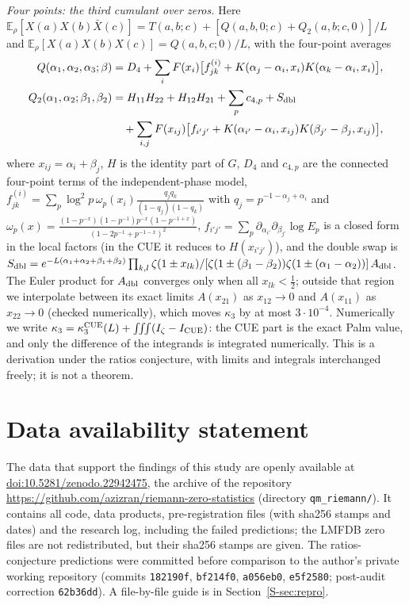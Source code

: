 \documentclass[12pt]{amsart}
\theoremstyle{remark}
\newcommand{\E}{\mathbb{E}}
\newcommand{\1}{\mathbf{1}}
\begin{document}
\emph{Four points: the third cumulant over zeros.} Here
$\E_\rho[X(a)X(b)\bar X(c)]=T(a,b;c)+[Q(a,b,0;c)+Q_2(a,b;c,0)]/L$ and
$\E_\rho[X(a)X(b)X(c)]=Q(a,b,c;0)/L$, with the four-point averages
\begin{align*}
Q(\alpha_1,\alpha_2,\alpha_3;\beta)&=D_4+\sum_iF(x_i)\bigl[f^{(i)}_{jk}
+K(\alpha_j-\alpha_i,x_i)K(\alpha_k-\alpha_i,x_i)\bigr],\\
Q_2(\alpha_1,\alpha_2;\beta_1,\beta_2)&=H_{11}H_{22}+H_{12}H_{21}+\sum_pc_{4,p}+S_{\rm dbl}\\
&\quad+\sum_{i,j}F(x_{ij})\bigl[f_{i'j'}+K(\alpha_{i'}-\alpha_i,x_{ij})K(\beta_{j'}-\beta_j,x_{ij})\bigr],
\end{align*}
where $x_{ij}=\alpha_i+\beta_j$, $H$ is the identity part of $G$, $D_4$ and
$c_{4,p}$ are the connected four-point terms of the independent-phase model,
$f^{(i)}_{jk}=\sum_p\log^2p\,\omega_p(x_i)\frac{q_jq_k}{(1-q_j)(1-q_k)}$ with
$q_j=p^{-1-\alpha_j+\alpha_i}$ and
$\omega_p(x)=\frac{(1-p^{-x})(1-p^{-1})p^{-x}(1-p^{-1+x})}{(1-2p^{-1}+p^{-1-x})^2}$,
$f_{i'j'}=\sum_p\partial_{\alpha_{i'}}\partial_{\beta_{j'}}\log E_p$ is a
closed form in the local factors (in the CUE it reduces to $H(x_{i'j'})$), and
the double swap is
$S_{\rm dbl}=e^{-L(\alpha_1+\alpha_2+\beta_1+\beta_2)}\prod_{k,l}\zeta(1\pm x_{lk})
/[\zeta(1\pm(\beta_1-\beta_2))\zeta(1\pm(\alpha_1-\alpha_2))]\,A_{\rm dbl}$.
The Euler product for $A_{\rm dbl}$ converges only when all $x_{lk}<\frac12$;
outside that region we interpolate between its exact limits
$A(x_{21})$ as $x_{12}\to0$ and $A(x_{11})$ as $x_{22}\to0$ (checked
numerically), which moves $\kappa_3$ by at most $3\cdot10^{-4}$. Numerically we
write $\kappa_3=\kappa_3^{\rm CUE}(L)+\iiint(I_\zeta-I_{\rm CUE})$: the CUE
part is the exact Palm value, and only the difference of the integrands is
integrated numerically. This is a derivation under the ratios conjecture,
with limits and integrals interchanged freely; it is not a theorem.

\section*{Data availability statement}

The data that support the findings of this study are openly available at
\href{https://doi.org/10.5281/zenodo.22942475}{doi:10.5281/zenodo.22942475},
the archive of the repository
\url{https://github.com/azizran/riemann-zero-statistics} (directory
\texttt{qm\_riemann/}). It contains all code, data products,
pre-registration files (with sha256 stamps and dates) and the research log,
including the failed predictions; the LMFDB zero files are not
redistributed, but their sha256 stamps are given. The ratios-conjecture
predictions were committed before comparison to the author's private
working repository (commits \texttt{182190f}, \texttt{bf214f0},
\texttt{a056eb0}, \texttt{e5f2580}; post-audit correction
\texttt{62b36dd}). A file-by-file guide is in Section~\ref{S-sec:repro}.
\end{document}
